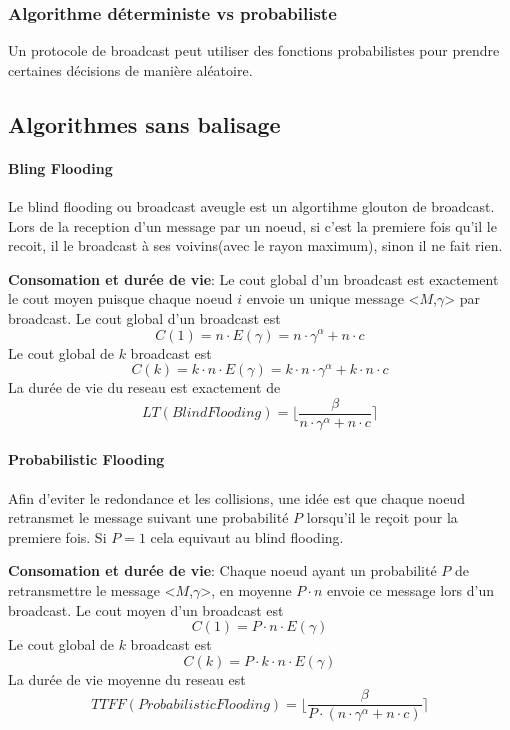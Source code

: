 \subsubsection{Algorithme déterministe vs probabiliste}
Un protocole de broadcast peut utiliser des fonctions probabilistes pour prendre certaines décisions de manière aléatoire.





\subsection{Algorithmes sans balisage}\label{algosSansBalisage}

\paragraph{Bling Flooding}

Le blind flooding ou broadcast aveugle est un algortihme glouton de broadcast. Lors de la reception d'un message par un noeud, si c'est la premiere fois qu'il le recoit, il le broadcast à ses voivins(avec le rayon maximum), sinon il
 ne fait rien.

\textbf{Consomation et durée de vie}: Le cout global d'un broadcast est exactement le cout moyen puisque chaque noeud $i$ envoie un unique message <$M$,$\gamma$> par broadcast.
Le cout global d'un broadcast est $$C(1) = n \cdot E( \gamma )= n\cdot \gamma^\alpha +  n\cdot c $$
Le cout global de $k$ broadcast est $$C(k) = k\cdot n \cdot E( \gamma )= k\cdot n \cdot \gamma^\alpha +  k \cdot n\cdot c $$
La durée de vie du reseau est exactement de $$LT(Blind Flooding)=\lfloor \frac{\beta}{n\cdot \gamma^\alpha +  n\cdot c} \rceil$$
\paragraph{Probabilistic Flooding}

Afin d'eviter le redondance et les collisions, une idée est que chaque noeud retransmet le message suivant une probabilité $P$ lorsqu'il le reçoit pour la premiere fois.
Si $P=1$ cela equivaut au blind flooding.

\textbf{Consomation et durée de vie}: Chaque noeud ayant un probabilité $P$ de retransmettre le message <$M$,$\gamma$>, en moyenne $P\cdot n$ envoie ce message lors d'un broadcast.
Le cout moyen d'un broadcast est $$C(1) = P\cdot n \cdot E( \gamma ) $$
Le cout global de $k$ broadcast est $$C(k) = P\cdot k\cdot n \cdot E( \gamma ) $$
La durée de vie moyenne du reseau est  $$TTFF(Probabilistic Flooding)=\lfloor \frac{\beta}{P \cdot (n\cdot \gamma^\alpha +  n\cdot c)} \rceil$$



